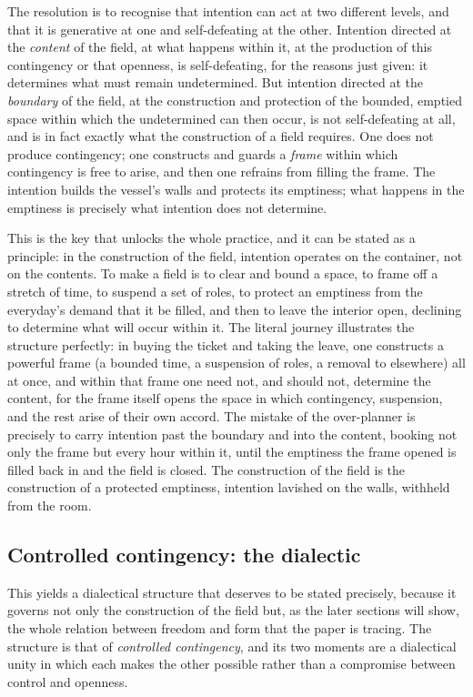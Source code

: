 The resolution is to recognise that intention can act at two different levels, and that it is generative at one and self-defeating at the other. Intention directed at the \emph{content} of the field, at what happens within it, at the production of this contingency or that openness, is self-defeating, for the reasons just given: it determines what must remain undetermined. But intention directed at the \emph{boundary} of the field, at the construction and protection of the bounded, emptied space within which the undetermined can then occur, is not self-defeating at all, and is in fact exactly what the construction of a field requires. One does not produce contingency; one constructs and guards a \emph{frame} within which contingency is free to arise, and then one refrains from filling the frame. The intention builds the vessel's walls and protects its emptiness; what happens in the emptiness is precisely what intention does not determine.

This is the key that unlocks the whole practice, and it can be stated as a principle: in the construction of the field, intention operates on the container, not on the contents. To make a field is to clear and bound a space, to frame off a stretch of time, to suspend a set of roles, to protect an emptiness from the everyday's demand that it be filled, and then to leave the interior open, declining to determine what will occur within it. The literal journey illustrates the structure perfectly: in buying the ticket and taking the leave, one constructs a powerful frame (a bounded time, a suspension of roles, a removal to elsewhere) all at once, and within that frame one need not, and should not, determine the content, for the frame itself opens the space in which contingency, suspension, and the rest arise of their own accord. The mistake of the over-planner is precisely to carry intention past the boundary and into the content, booking not only the frame but every hour within it, until the emptiness the frame opened is filled back in and the field is closed. The construction of the field is the construction of a protected emptiness, intention lavished on the walls, withheld from the room.

\subsection{Controlled contingency: the dialectic}
\label{p21:sub:constr-controlled}

This yields a dialectical structure that deserves to be stated precisely, because it governs not only the construction of the field but, as the later sections will show, the whole relation between freedom and form that the paper is tracing. The structure is that of \emph{controlled contingency}, and its two moments are a dialectical unity in which each makes the other possible rather than a compromise between control and openness.

